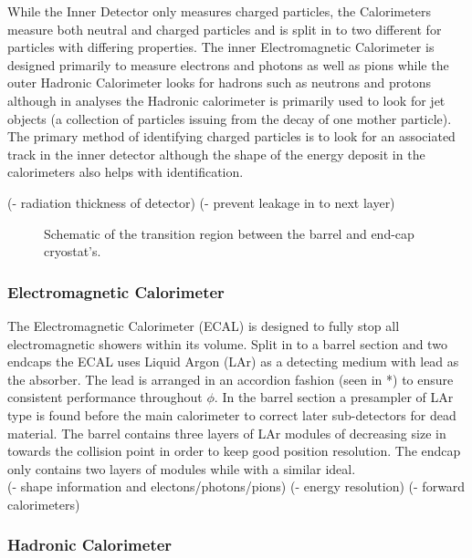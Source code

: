 		While the Inner Detector only measures charged particles, the Calorimeters measure both neutral and charged particles and is split in to two different for particles with differing properties. The inner Electromagnetic Calorimeter is designed primarily to measure electrons and photons as well as pions while the outer Hadronic Calorimeter looks for hadrons such as neutrons and protons although in analyses the Hadronic calorimeter is primarily used to look for jet objects (a collection of particles issuing from the decay of one mother particle). The primary method of identifying charged particles is to look for an associated track in the inner detector although the shape of the energy deposit in the calorimeters also helps with identification.

		(- radiation thickness of detector)
		(- prevent leakage in to next layer)


		\begin{figure}[h]
			\begin{center}
			\end{center}
			\caption{Schematic of the transition region between the barrel and end-cap cryostat's.}
			\label{fig:ATLAS_calo_crack}
		\end{figure}


		\subsubsection*{Electromagnetic Calorimeter}

		The Electromagnetic Calorimeter (ECAL) is designed to fully stop all electromagnetic showers within its volume. Split in to a barrel section and two endcaps the ECAL uses Liquid Argon (LAr) as a detecting medium with lead as the absorber. The lead is arranged in an accordion fashion (seen in *) to ensure consistent performance throughout $\phi$. In the barrel section a presampler of LAr type is found before the main calorimeter to correct later sub-detectors for dead material. The barrel contains three layers of LAr modules of decreasing size in towards the collision point in order to keep good position resolution. The endcap only contains two layers of modules while with a similar ideal.\\

		(- shape information and electons/photons/pions)
		(- energy resolution)
		(- forward calorimeters)

		\subsubsection*{Hadronic Calorimeter}

